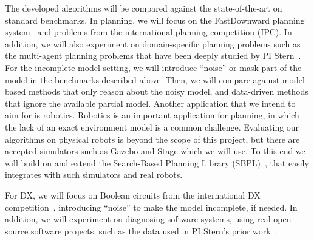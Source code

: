 \documentclass[12pt]{article}
\begin{document}
The developed algorithms will be compared against the state-of-the-art on standard benchmarks. In planning, 
we will focus on the FastDownward planning system~\cite{helmert2006fast} and problems from the international planning competition (IPC). 
In addition, we will also experiment on domain-specific planning problems such as the multi-agent planning problems that have been deeply studied by PI Stern~\cite{sharon2013increasing,sharon2015conflict,boyarski2015icbs,boyrasky2015dont,maliah2016collaborative}. 
For the incomplete model setting, we will introduce ``noise'' or mask part of the model in the benchmarks described above. Then, we will compare against model-based methods that only reason about the noisy model, and data-driven methods that ignore the available partial model. 
Another application that we intend to aim for is robotics. 
Robotics is an important application for planning, in which the lack of an exact environment model is a common challenge. Evaluating our algorithms on physical robots is beyond the scope of this project, but there are accepted simulators such as Gazebo and Stage which we will use. To this end we will build on and extend the Search-Based Planning Library (SBPL)~\cite{likhachev2014sbpl}, that easily integrates with such simulators and real robots. 

For DX, we will focus on Boolean circuits from the international DX competition~\cite{poll2011third}, introducing ``noise'' to make the model incomplete, if needed. In addition, we will experiment on diagnosing software systems, using real open source software projects, such as the data used in PI Stern's prior work~\cite{Zamir2014UsingMD,elmishali2016dataAugmented,barIlan2017learningSoftwareBehavior}. 

\end{document}
